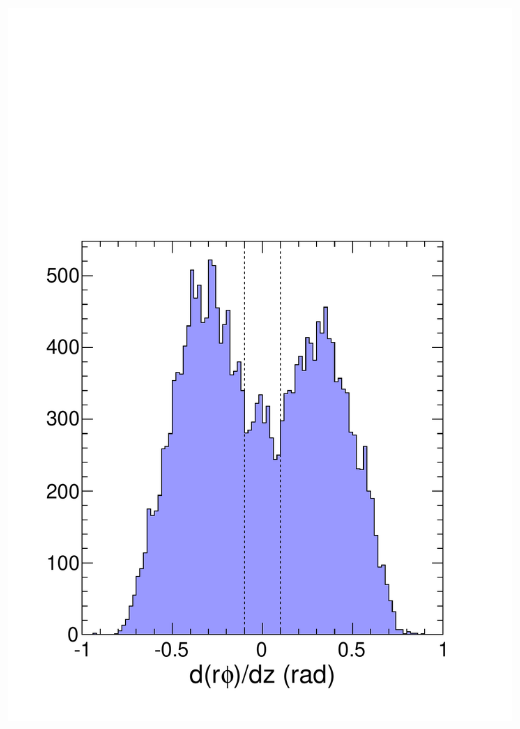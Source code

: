 \documentclass[compress]{beamer}
\begin{document}
\begin{frame}
\begin{columns}
\includegraphics[width=\linewidth]{cosmic_beampointing.pdf}
\end{columns}
\end{frame}
\end{document}
